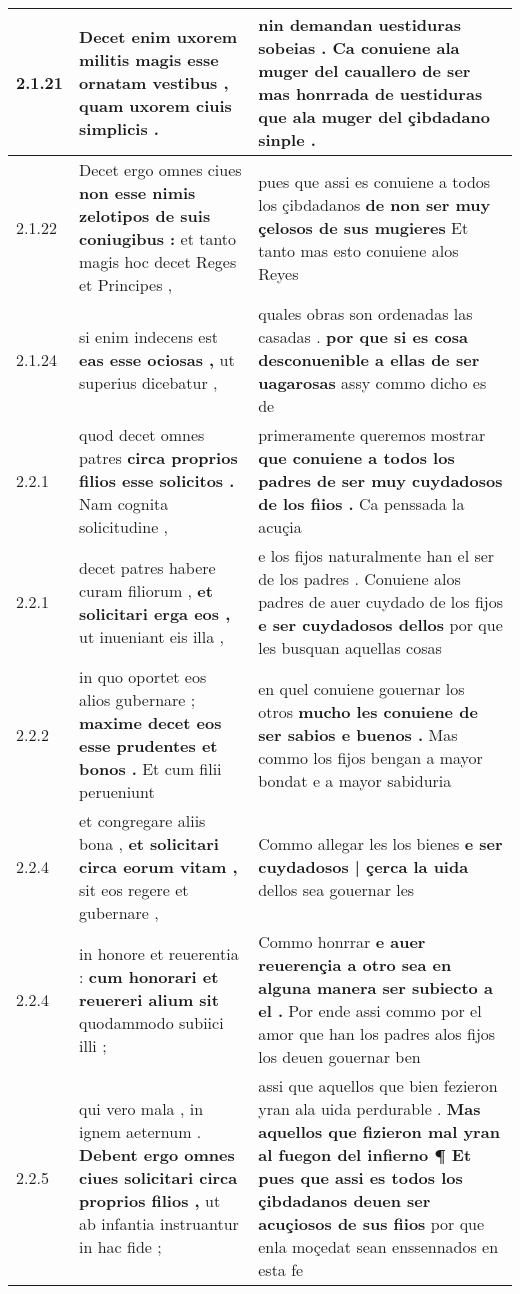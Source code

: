 \begin{tabular}{|p{1cm}|p{6.5cm}|p{6.5cm}|}
2.1.21 & Decet enim uxorem militis \textbf{ magis esse ornatam vestibus , } quam uxorem ciuis simplicis . & nin demandan uestiduras sobeias . \textbf{ Ca conuiene ala muger del cauallero de ser mas honrrada de uestiduras } que ala muger del çibdadano sinple . \\\hline
2.1.22 & Decet ergo omnes ciues \textbf{ non esse nimis zelotipos de suis coniugibus : } et tanto magis hoc decet Reges et Principes , & pues que assi es conuiene a todos los çibdadanos \textbf{ de non ser muy çelosos de sus mugieres } Et tanto mas esto conuiene alos Reyes \\\hline
2.1.24 & si enim indecens est \textbf{ eas esse ociosas , } ut superius dicebatur , & quales obras son ordenadas las casadas . \textbf{ por que si es cosa desconuenible a ellas de ser uagarosas } assy commo dicho es de \\\hline
2.2.1 & quod decet omnes patres \textbf{ circa proprios filios esse solicitos . } Nam cognita solicitudine , & primeramente queremos mostrar \textbf{ que conuiene a todos los padres de ser muy cuydadosos de los fiios . } Ca penssada la acuçia \\\hline
2.2.1 & decet patres habere curam filiorum , \textbf{ et solicitari erga eos , } ut inueniant eis illa , & e los fijos naturalmente han el ser de los padres . Conuiene alos padres de auer cuydado de los fijos \textbf{ e ser cuydadosos dellos } por que les busquan aquellas cosas \\\hline
2.2.2 & in quo oportet eos alios gubernare ; \textbf{ maxime decet eos esse prudentes et bonos . } Et cum filii perueniunt & en quel conuiene gouernar los otros \textbf{ mucho les conuiene de ser sabios e buenos . } Mas commo los fijos bengan a mayor bondat e a mayor sabiduria \\\hline
2.2.4 & et congregare aliis bona , \textbf{ et solicitari circa eorum vitam , } sit eos regere et gubernare , & Commo allegar les los bienes \textbf{ e ser cuydadosos | çerca la uida } dellos sea gouernar les \\\hline
2.2.4 & in honore et reuerentia : \textbf{ cum honorari et reuereri alium sit } quodammodo subiici illi ; & Commo honrrar \textbf{ e auer reuerençia a otro sea en alguna manera ser subiecto a el . } Por ende assi commo por el amor que han los padres alos fijos los deuen gouernar ben \\\hline
2.2.5 & qui vero mala , in ignem aeternum . \textbf{ Debent ergo omnes ciues solicitari circa proprios filios , } ut ab infantia instruantur in hac fide ; & assi que aquellos que bien fezieron yran ala uida perdurable . \textbf{ Mas aquellos que fizieron mal yran al fuegon del infierno ¶ Et pues que assi es todos los çibdadanos deuen ser acuçiosos de sus fiios } por que enla moçedat sean enssennados en esta fe \\\hline

\end{tabular}
